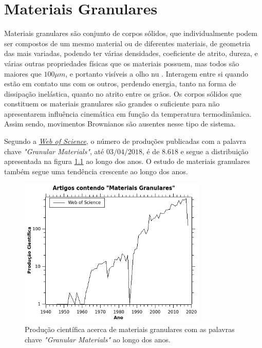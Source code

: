 
\chapter{Materiais Granulares}
\label{chap:Trabalhos-Relacionados}


    Materiais granulares são conjunto de corpos sólidos, que individualmente podem ser compostos de um mesmo material ou de diferentes materiais, de geometria das mais variadas, podendo ter várias densidades, coeficiente de atrito, dureza, e várias outras propriedades físicas que os materiais possuem, mas todos são maiores que $100\mu m$, e portanto visíveis a olho nu \cite{Sands_Powders_and_Grains}. Interagem entre si quando estão em contato uns com os outros, perdendo energia, tanto na forma de dissipação inelástica, quanto no atrito entre os grãos.
    Os corpos sólidos que constituem os materiais granulares são grandes o suficiente para não apresentarem influência cinemática em função da temperatura termodinâmica. Assim sendo, movimentos Brownianos são ausentes nesse tipo de sistema.

    Segundo a \href{http://webofknowledge.com}{\textit{Web of Science}}, o número de produções publicadas com a palavra chave \textit{"Granular Materials"}, até $03/04/2018$, é de $8.618$ e segue a distribuição apresentada na figura \ref{fig:articles-year} ao longo dos anos. O estudo de materiais granulares também segue uma tendência crescente ao longo dos anos.
    
\begin{figure}
    \centering
    \includegraphics[width=0.8\textwidth]{04-figuras/articles-year.png}
    \caption{Produção científica acerca de materiais granulares com as palavras chave \textit{"Granular Materials"} ao longo dos anos.}
    \label{fig:articles-year}
\end{figure}

